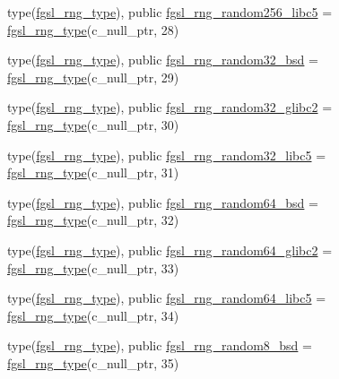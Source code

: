 \begin{DoxyCompactItemize}
\item 
type(\hyperlink{structfgsl_1_1fgsl__rng__type}{fgsl\+\_\+rng\+\_\+type}), public \hyperlink{namespacefgsl_a07865f4f3a0cd07f3e922da1b3616e68}{fgsl\+\_\+rng\+\_\+random256\+\_\+libc5} = \hyperlink{structfgsl_1_1fgsl__rng__type}{fgsl\+\_\+rng\+\_\+type}(c\+\_\+null\+\_\+ptr, 28)
\item 
type(\hyperlink{structfgsl_1_1fgsl__rng__type}{fgsl\+\_\+rng\+\_\+type}), public \hyperlink{namespacefgsl_a1adf276b8f59b011e5a28451b9245a96}{fgsl\+\_\+rng\+\_\+random32\+\_\+bsd} = \hyperlink{structfgsl_1_1fgsl__rng__type}{fgsl\+\_\+rng\+\_\+type}(c\+\_\+null\+\_\+ptr, 29)
\item 
type(\hyperlink{structfgsl_1_1fgsl__rng__type}{fgsl\+\_\+rng\+\_\+type}), public \hyperlink{namespacefgsl_a26cb9ca6b94f3b1db24cdc006f07196a}{fgsl\+\_\+rng\+\_\+random32\+\_\+glibc2} = \hyperlink{structfgsl_1_1fgsl__rng__type}{fgsl\+\_\+rng\+\_\+type}(c\+\_\+null\+\_\+ptr, 30)
\item 
type(\hyperlink{structfgsl_1_1fgsl__rng__type}{fgsl\+\_\+rng\+\_\+type}), public \hyperlink{namespacefgsl_a85c8b85216d7705c54a071e06a65d871}{fgsl\+\_\+rng\+\_\+random32\+\_\+libc5} = \hyperlink{structfgsl_1_1fgsl__rng__type}{fgsl\+\_\+rng\+\_\+type}(c\+\_\+null\+\_\+ptr, 31)
\item 
type(\hyperlink{structfgsl_1_1fgsl__rng__type}{fgsl\+\_\+rng\+\_\+type}), public \hyperlink{namespacefgsl_a4f1fadb8ae8e69bc97fa0ce10b8c2669}{fgsl\+\_\+rng\+\_\+random64\+\_\+bsd} = \hyperlink{structfgsl_1_1fgsl__rng__type}{fgsl\+\_\+rng\+\_\+type}(c\+\_\+null\+\_\+ptr, 32)
\item 
type(\hyperlink{structfgsl_1_1fgsl__rng__type}{fgsl\+\_\+rng\+\_\+type}), public \hyperlink{namespacefgsl_afa30a9f9486fc4a3ebc5c98fdf7c2734}{fgsl\+\_\+rng\+\_\+random64\+\_\+glibc2} = \hyperlink{structfgsl_1_1fgsl__rng__type}{fgsl\+\_\+rng\+\_\+type}(c\+\_\+null\+\_\+ptr, 33)
\item 
type(\hyperlink{structfgsl_1_1fgsl__rng__type}{fgsl\+\_\+rng\+\_\+type}), public \hyperlink{namespacefgsl_a5d485fce442bdf380a13906f23f519cb}{fgsl\+\_\+rng\+\_\+random64\+\_\+libc5} = \hyperlink{structfgsl_1_1fgsl__rng__type}{fgsl\+\_\+rng\+\_\+type}(c\+\_\+null\+\_\+ptr, 34)
\item 
type(\hyperlink{structfgsl_1_1fgsl__rng__type}{fgsl\+\_\+rng\+\_\+type}), public \hyperlink{namespacefgsl_a03a999d95485529c23b1eeb38284dd6a}{fgsl\+\_\+rng\+\_\+random8\+\_\+bsd} = \hyperlink{structfgsl_1_1fgsl__rng__type}{fgsl\+\_\+rng\+\_\+type}(c\+\_\+null\+\_\+ptr, 35)
\item 

\end{DoxyCompactItemize}
